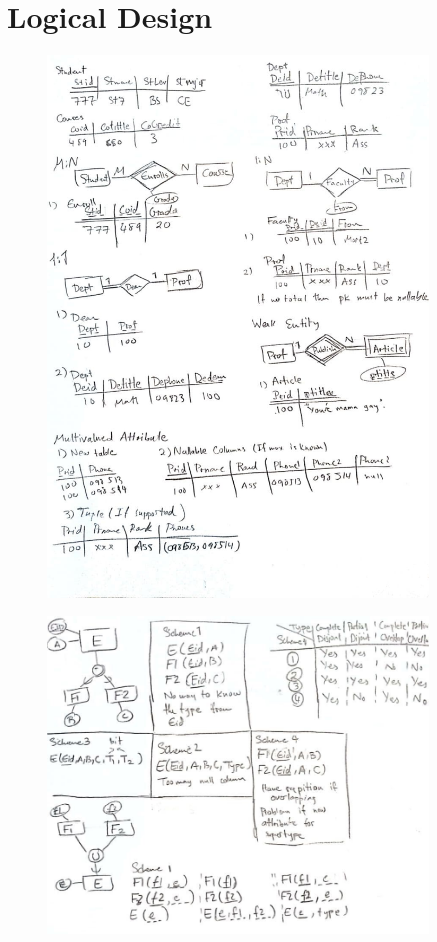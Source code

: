 \chapter{Logical Design}
\begin{figure}
    \centering
    \includegraphics[width = 0.9\textwidth]{Graphics/logical1.jpg}
\end{figure}
\begin{figure}
    \centering
    \includegraphics[width = 0.9\textwidth]{Graphics/logical 2.jpg}
\end{figure}